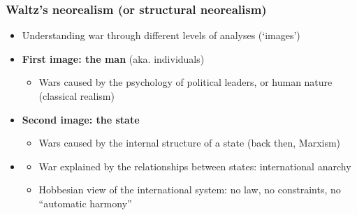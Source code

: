 \documentclass[aspectratio=43]{beamer}
\begin{document}
\begin{frame}
\frametitle{Waltz's neorealism (or structural neorealism)}
\centering


\begin{minipage}{0.71\textwidth}\centering
\begin{itemize}[<+->]
\item Understanding war through different levels of analyses (`images')
\item \textbf{First image: the man} (aka. individuals)
  \begin{itemize}
  \item Wars caused by the psychology of political leaders, or human nature (classical realism)
  \end{itemize}
\item \textbf{Second image: the state}
  \begin{itemize}
  \item Wars caused by the internal structure of a state (back then, Marxism)
  \end{itemize}
\item {}
  \begin{itemize}
  \item War explained by the relationships between states: international anarchy
  \item Hobbesian view of the international system: no law, no constraints, no ``automatic harmony''
  \end{itemize}
\end{itemize}
\end{minipage}\hfill
\begin{minipage}{0.28\textwidth}\centering

\end{minipage}
\end{frame}
\end{document}
